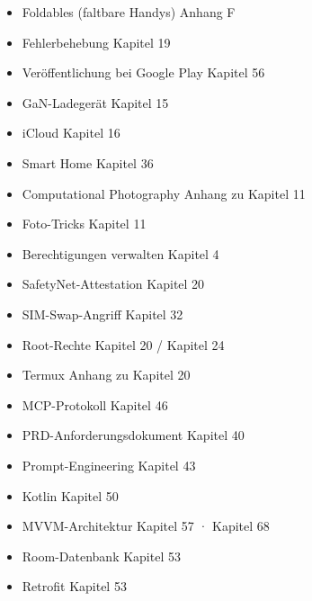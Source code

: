 \begin{itemize}
  \item Foldables (faltbare Handys) Anhang F
  \item Fehlerbehebung Kapitel 19
  \item Veröffentlichung bei Google Play Kapitel 56
  \item GaN-Ladegerät Kapitel 15
  \item iCloud Kapitel 16
  \item Smart Home Kapitel 36
  \item Computational Photography Anhang zu Kapitel 11
\end{itemize}


\begin{itemize}
  \item Foto-Tricks Kapitel 11
  \item Berechtigungen verwalten Kapitel 4
  \item SafetyNet-Attestation Kapitel 20
  \item SIM-Swap-Angriff Kapitel 32
  \item Root-Rechte Kapitel 20 / Kapitel 24
  \item Termux Anhang zu Kapitel 20
  \item MCP-Protokoll Kapitel 46
  \item PRD-Anforderungsdokument Kapitel 40
  \item Prompt-Engineering Kapitel 43
  \item Kotlin Kapitel 50
  \item MVVM-Architektur Kapitel 57 · Kapitel 68
  \item Room-Datenbank Kapitel 53
  \item Retrofit Kapitel 53
\end{itemize}


